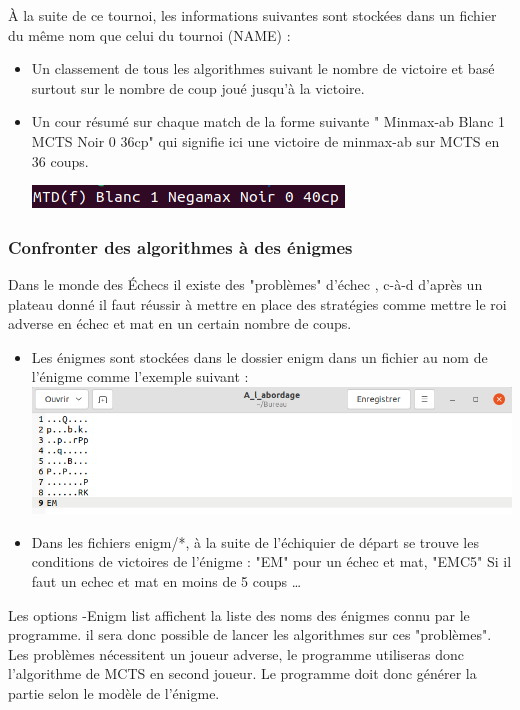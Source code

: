 \huge\documentclass{article}
\begin{document}
    À la suite de ce tournoi, les informations suivantes sont stockées dans un fichier du même nom que celui du tournoi (NAME) :
    \begin{itemize}
        \item Un classement de tous les algorithmes suivant le nombre de victoire et basé surtout sur le nombre de coup joué jusqu'à la victoire.
        \item Un cour résumé sur chaque match de la forme suivante " Minmax-ab Blanc 1 MCTS Noir 0 36cp" qui signifie ici une victoire de minmax-ab sur MCTS en 36 coups.
        \newline
        \centerline{\includegraphics[scale = 0.5]{img/Summarytournament.png}}
    \end{itemize}
    \medskip
    \subsubsection{Confronter des algorithmes à des énigmes}
    Dans le monde des Échecs il existe des "problèmes" d'échec \cite{Krt}, c-à-d d'après un plateau donné il faut réussir à mettre en place des stratégies comme mettre le roi adverse en échec et mat en un certain nombre de coups.\newline
    \begin{itemize}
        \item Les énigmes sont stockées dans le dossier enigm dans un fichier au nom de l'énigme comme l'exemple suivant : \newline
        \includegraphics[scale = 0.3]{img/a_l_abordage.png}
        \item Dans les fichiers enigm/*, à la suite de l'échiquier de départ se trouve les conditions de victoires de l'énigme : "EM" pour un échec et mat, "EMC5" Si il faut un echec et mat en moins de 5 coups \dots
    \end{itemize}
    Les options -Enigm list affichent la liste des noms des énigmes connu par le programme.
    il sera donc possible de lancer les algorithmes sur ces "problèmes".
    Les problèmes nécessitent un joueur adverse, le programme utiliseras donc l'algorithme de MCTS en second joueur.
    Le programme doit donc générer la partie selon le modèle de l'énigme.
\end{document}
